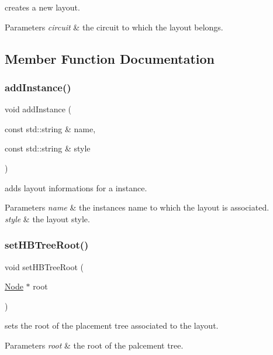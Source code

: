 creates a new layout. 


\begin{DoxyParams}{Parameters}
{\em circuit} & the circuit to which the layout belongs. \\
\hline
\end{DoxyParams}


\subsection{Member Function Documentation}
\mbox{\label{class_open_chams_1_1_layout_a4cc1899e9b782de44700fa0e4ac477ef}} 
\subsubsection{\texorpdfstring{add\+Instance()}{addInstance()}}
{\footnotesize\ttfamily void add\+Instance (\begin{DoxyParamCaption}\item[{const std\+::string \&}]{name,  }\item[{const std\+::string \&}]{style }\end{DoxyParamCaption})}



adds layout informations for a instance. 


\begin{DoxyParams}{Parameters}
{\em name} & the instance\textquotesingle{}s name to which the layout is associated. \\
\hline
{\em style} & the layout style. \\
\hline
\end{DoxyParams}
\mbox{\label{class_open_chams_1_1_layout_a6d828958e0faf1346b27276eab101858}} 
\subsubsection{\texorpdfstring{set\+H\+B\+Tree\+Root()}{setHBTreeRoot()}}
{\footnotesize\ttfamily void set\+H\+B\+Tree\+Root (\begin{DoxyParamCaption}\item[{\mbox{\hyperlink{class_open_chams_1_1_node}{Node}} $\ast$}]{root }\end{DoxyParamCaption})\hspace{0.3cm}{\ttfamily [inline]}}



sets the root of the placement tree associated to the layout. 


\begin{DoxyParams}{Parameters}
{\em root} & the root of the palcement tree. \\
\hline
\end{DoxyParams}
